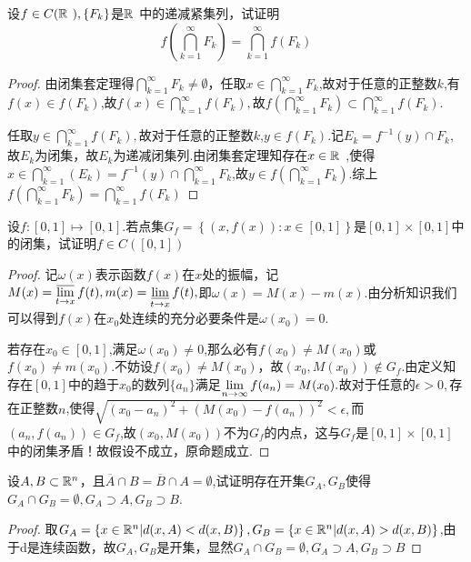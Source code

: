 设$f\in C(\mathbb{R}^{\ }),\{F_k\}$是$\R{R}{\ }$中的递减紧集列，试证明$$f\left( \bigcap\limits_{k=1}^{\infty}F_k \right)=\bigcap\limits_{k=1}^{\infty}f(F_k) $$
\begin{proof}
	由闭集套定理得$ \bigcap\limits_{k=1}^{\infty}F_k\neq \emptyset$，任取$ x\in \bigcap\limits_{k=1}^{\infty}F_k$,故对于任意的正整数$k$,有$f(x)\in f(F_k)$,故$f(x)\in \bigcap\limits_{k=1}^{\infty}f(F_k),$故$f\left( \bigcap\limits_{k=1}^{\infty}F_k \right)\subset \bigcap\limits_{k=1}^{\infty}f(F_k) $.\par 
	任取$y\in \bigcap\limits_{k=1}^{\infty}f(F_k),$故对于任意的正整数$k$,$y\in f(F_k)$.记$E_k=f^{-1}(y)\cap F_k,$故$E_k$为闭集，故$E_k$为递减闭集列.由闭集套定理知存在$x\in \R{R}{\ }$,使得$x\in \bigcap\limits_{k=1}^{\infty}\left(E_k \right)=f^{-1}(y)\cap  \bigcap\limits_{k=1}^{\infty}F_k$,故$y\in f\left( \bigcap\limits_{k=1}^{\infty}F_k \right)$.综上$f\left( \bigcap\limits_{k=1}^{\infty}F_k \right)=\bigcap\limits_{k=1}^{\infty}f(F_k) $
\end{proof}


设$f:[0,1]\mapsto[0,1]$.若点集$G_f=\left\lbrace (x,f(x)):x\in[0,1]\right\rbrace $是$[0,1]\times[0,1]$中的闭集，试证明$f\in C([0,1])$
\begin{proof}
	记$\omega(x)$表示函数$f(x)$在$x$处的振幅，记$M(x)=\varlimsup\limits_{t \to x}f(t),m(x)=\varliminf\limits_{t \to x}f(t),$即$\omega(x)=M(x)-m(x)$.由分析知识我们可以得到$f(x)$在$x_0$处连续的充分必要条件是$\omega(x_0)=0.$\par 
	若存在$x_0\in [0,1]$,满足$\omega(x_0)\neq 0$,那么必有$f(x_0)\neq M(x_0)$或$f(x_0)\neq m(x_0).$不妨设$f(x_0)\neq M(x_0)$，故$(x_0,M(x_0))\notin G_f$.由定义知存在$[0,1]$中的趋于$x_0$的数列$\{a_n\}$满足$\lim\limits_{n\to \infty}f(a_n)=M(x_0).$故对于任意的$\epsilon>0,$存在正整数$n$,使得$\sqrt{(x_0-a_n)^2+(M(x_0)-f(a_n))^2}<\epsilon,$而$(a_n,f(a_n))\in G_f$,故$(x_0,M(x_0))$不为$G_f$的内点，这与$G_f $是$[0,1]\times[0,1]$中的闭集矛盾！故假设不成立，原命题成立.
\end{proof}

设$A,B\subset \mathbb{R}^{n}$，且$\overline{A}\cap B=\overline{B}\cap A=\emptyset$,试证明存在开集$G_A,G_B$使得$G_A\cap G_B=\emptyset,G_A\supset A,G_B\supset B$.
\begin{proof}
	取$G_A=\left\lbrace x\in \mathbb{R}^{n}|d(x,A)<d(x,B)\right\rbrace,G_B=\left\lbrace x\in \mathbb{R}^{n}|d(x,A)>d(x,B)\right\rbrace $,由于d是连续函数，故$G_A,G_B$是开集，显然$G_A\cap G_B=\emptyset,G_A\supset A,G_B\supset B$
\end{proof}